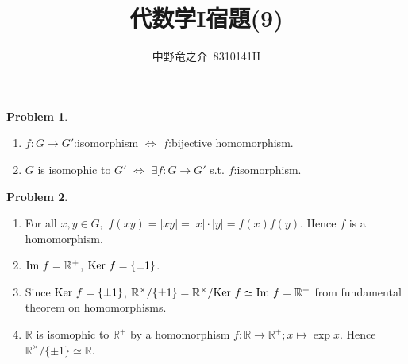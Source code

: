 \documentclass[a4paper, 12pt, fleqn]{article}
\title{代数学I宿題(9)}
\author{中野竜之介\ 8310141H}
\theoremstyle{definition}
\newtheorem{prb}{Problem}
\newcommand{\image}[1]{{\rm Im\ }#1}
\newcommand{\kernel}[1]{{\rm Ker\ }#1}
\begin{document}
\maketitle

\begin{prb}
    $ $
    \begin{enumerate}
        \item $f:G\to G'$:isomorphism $\Leftrightarrow$ $f$:bijective homomorphism.
        \item $G$ is isomophic to $G'$ $\Leftrightarrow$ $\exists f:G\to G'$ s.t. $f$:isomorphism.
    \end{enumerate}
\end{prb}

\begin{prb}
    $ $
    \begin{enumerate}
        \item For all $x,y\in G,$ $f(xy) = |xy|=|x|\cdot|y| = f(x)f(y)$. Hence $f$ is a homomorphism.
        \item $\image{f} = \mathbb{R}^{+}$, $\kernel{f}=\{\pm 1\}$.
        \item Since $\kernel{f} = \{\pm 1\}$, $\mathbb{R}^{\times} / \{\pm 1\}=\mathbb{R}^{\times} / \kernel{f}  \simeq \image{f} = \mathbb{R}^{+}$ from fundamental theorem on homomorphisms.
        \item $\mathbb{R}$ is isomophic to $\mathbb{R}^{+}$ by a homomorphism $f:\mathbb{R}\to \mathbb{R}^{+};x \mapsto \exp{x}$. Hence $\mathbb{R}^{\times} /\{\pm 1\} \simeq \mathbb{R}$.
    \end{enumerate}
\end{prb}
\end{document}
